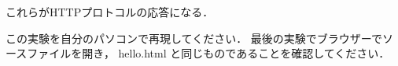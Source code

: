 \begin{itemize}
\begin{verbatim}
\end{verbatim}
 
       \noindent
       これらがHTTPプロトコルの応答になる．
    
      \begin{Q}
         この実験を自分のパソコンで再現してください．
         最後の実験でブラウザーでソースファイルを開き，
         hello.html と同じものであることを確認してください．
      \end{Q}

\end{itemize}


%




